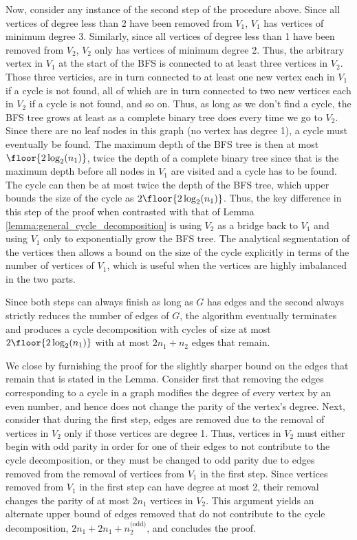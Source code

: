 \documentclass[10pt]{article}
\begin{document}
\begin{ReviewVerbatim}
			Now, consider any instance of the second step of the procedure above. Since all vertices of degree less than 2 have been removed from $V_1$, $V_1$ has vertices of minimum degree 3. Similarly, since all vertices of degree less than 1 have been removed from $V_2$, $V_2$ only has vertices of minimum degree 2. Thus, the arbitrary vertex in $V_1$ at the start of the BFS is connected to at least three vertices in $V_2$. Those three verticies, are in turn connected to at least one new vertex each in $V_1$ if a cycle is not found, all of which are in turn connected to two new vertices each in $V_2$ if a cycle is not found, and so on. Thus, as long as we don't find a cycle, the BFS tree grows at least as a complete binary tree does every time we go to $V_2$. Since there are no leaf nodes in this graph (no vertex has degree 1), a cycle must eventually be found. The maximum depth of the BFS tree is then at most $\floor{2 \log_2(n_1)}$, twice the depth of a complete binary tree since that is the maximum depth before all nodes in $V_1$ are visited and a cycle has to be found. The cycle can then be at most twice the depth of the BFS tree, which upper bounds the size of the cycle as $2\floor{2 \log_2(n_1)}$. Thus, the key difference in this step of the proof when contrasted with that of Lemma \ref{lemma:general_cycle_decomposition} is using $V_2$ as a bridge back to $V_1$ and using $V_1$ only to exponentially grow the BFS tree. The analytical segmentation of the vertices then allows a bound on the size of the cycle explicitly in terms of the number of vertices of $V_1$, which is useful when the vertices are highly imbalanced in the two parts.

			Since both steps can always finish as long as $G$ has edges and the second always strictly reduces the number of edges of $G$, the algorithm eventually terminates and produces a cycle decomposition with cycles of size at most $2\floor{2 \log_2(n_1)}$ with at most $2n_1 + n_2$ edges that remain.

			We close by furnishing the proof for the slightly sharper bound on the edges that remain that is stated in the Lemma. Consider first that removing the edges corresponding to a cycle in a graph modifies the degree of every vertex by an even number, and hence does not change the parity of the vertex's degree. Next, consider that during the first step, edges are removed due to the removal of vertices in $V_2$ only if those vertices are degree 1. Thus, vertices in $V_2$ must either begin with odd parity in order for one of their edges to not contribute to the cycle decomposition, or they must be changed to odd parity due to edges removed from the removal of vertices from $V_1$ in the first step. Since vertices removed from $V_1$ in the first step can have degree at most 2, their removal changes the parity of at most $2n_1$ vertices in $V_2$. This argument yields an alternate upper bound of edges removed that do not contribute to the cycle decomposition, $2n_1 + 2n_1 + n_2^\text{(odd)}$, and concludes the proof.
\end{ReviewVerbatim}
\end{document}
